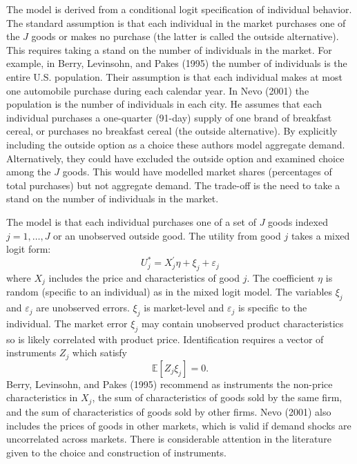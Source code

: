 \documentclass[10pt]{article}
\begin{document}
The model is derived from a conditional logit specification of individual behavior. The standard assumption is that each individual in the market purchases one of the $J$ goods or makes no purchase (the latter is called the outside alternative). This requires taking a stand on the number of individuals in the market. For example, in Berry, Levinsohn, and Pakes (1995) the number of individuals is the entire U.S. population. Their assumption is that each individual makes at most one automobile purchase during each calendar year. In Nevo (2001) the population is the number of individuals in each city. He assumes that each individual purchases a one-quarter (91-day) supply of one brand of breakfast cereal, or purchases no breakfast cereal (the outside alternative). By explicitly including the outside option as a choice these authors model aggregate demand. Alternatively, they could have excluded the outside option and examined choice among the $J$ goods. This would have modelled market shares (percentages of total purchases) but not aggregate demand. The trade-off is the need to take a stand on the number of individuals in the market.

The model is that each individual purchases one of a set of $J$ goods indexed $j=1, \ldots, J$ or an unobserved outside good. The utility from good $j$ takes a mixed logit form:
$$
U_{j}^{*}=X_{j}^{\prime} \eta+\xi_{j}+\varepsilon_{j}
$$
where $X_{j}$ includes the price and characteristics of good $j$. The coefficient $\eta$ is random (specific to an individual) as in the mixed logit model. The variables $\xi_{j}$ and $\varepsilon_{j}$ are unobserved errors. $\xi_{j}$ is market-level and $\varepsilon_{j}$ is specific to the individual. The market error $\xi_{j}$ may contain unobserved product characteristics so is likely correlated with product price. Identification requires a vector of instruments $Z_{j}$ which satisfy
$$
\mathbb{E}\left[Z_{j} \xi_{j}\right]=0 .
$$
Berry, Levinsohn, and Pakes (1995) recommend as instruments the non-price characteristics in $X_{j}$, the sum of characteristics of goods sold by the same firm, and the sum of characteristics of goods sold by other firms. Nevo (2001) also includes the prices of goods in other markets, which is valid if demand shocks are uncorrelated across markets. There is considerable attention in the literature given to the choice and construction of instruments.
\end{document}
